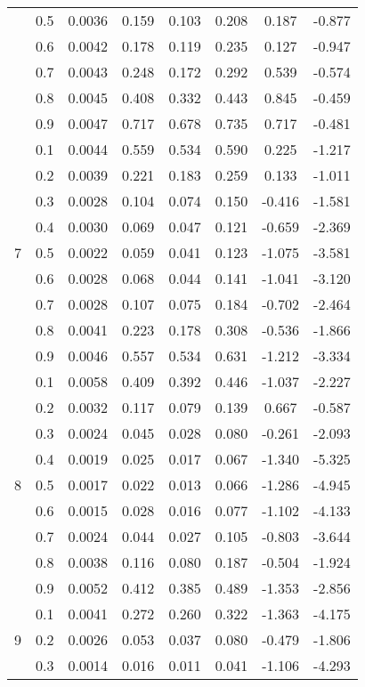 \documentclass[11pt,a4paper]{report}
\begin{document}
\begin{longtable}{ | c | c || c | c | c | c | c | c | }
 & 0.5 & 0.0036 & 0.159 & 0.103 & 0.208 & 0.187 & -0.877 \\
 & 0.6 & 0.0042 & 0.178 & 0.119 & 0.235 & 0.127 & -0.947 \\
 & 0.7 & 0.0043 & 0.248 & 0.172 & 0.292 & 0.539 & -0.574 \\
 & 0.8 & 0.0045 & 0.408 & 0.332 & 0.443 & 0.845 & -0.459 \\
 & 0.9 & 0.0047 & 0.717 & 0.678 & 0.735 & 0.717 & -0.481 \\
 \hline
\multirow{9}{*}{7} & 0.1 & 0.0044 & 0.559 & 0.534 & 0.590 & 0.225 & -1.217 \\
 & 0.2 & 0.0039 & 0.221 & 0.183 & 0.259 & 0.133 & -1.011 \\
 & 0.3 & 0.0028 & 0.104 & 0.074 & 0.150 & -0.416 & -1.581 \\
 & 0.4 & 0.0030 & 0.069 & 0.047 & 0.121 & -0.659 & -2.369 \\
 & 0.5 & 0.0022 & 0.059 & 0.041 & 0.123 & -1.075 & -3.581 \\
 & 0.6 & 0.0028 & 0.068 & 0.044 & 0.141 & -1.041 & -3.120 \\
 & 0.7 & 0.0028 & 0.107 & 0.075 & 0.184 & -0.702 & -2.464 \\
 & 0.8 & 0.0041 & 0.223 & 0.178 & 0.308 & -0.536 & -1.866 \\
 & 0.9 & 0.0046 & 0.557 & 0.534 & 0.631 & -1.212 & -3.334 \\
 \hline
\multirow{9}{*}{8} & 0.1 & 0.0058 & 0.409 & 0.392 & 0.446 & -1.037 & -2.227 \\
 & 0.2 & 0.0032 & 0.117 & 0.079 & 0.139 & 0.667 & -0.587 \\
 & 0.3 & 0.0024 & 0.045 & 0.028 & 0.080 & -0.261 & -2.093 \\
 & 0.4 & 0.0019 & 0.025 & 0.017 & 0.067 & -1.340 & -5.325 \\
 & 0.5 & 0.0017 & 0.022 & 0.013 & 0.066 & -1.286 & -4.945 \\
 & 0.6 & 0.0015 & 0.028 & 0.016 & 0.077 & -1.102 & -4.133 \\
 & 0.7 & 0.0024 & 0.044 & 0.027 & 0.105 & -0.803 & -3.644 \\
 & 0.8 & 0.0038 & 0.116 & 0.080 & 0.187 & -0.504 & -1.924 \\
 & 0.9 & 0.0052 & 0.412 & 0.385 & 0.489 & -1.353 & -2.856 \\
 \hline
\multirow{9}{*}{9} & 0.1 & 0.0041 & 0.272 & 0.260 & 0.322 & -1.363 & -4.175 \\
 & 0.2 & 0.0026 & 0.053 & 0.037 & 0.080 & -0.479 & -1.806 \\
 & 0.3 & 0.0014 & 0.016 & 0.011 & 0.041 & -1.106 & -4.293 \\

\end{longtable}
\end{document}
